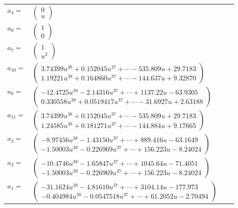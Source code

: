 \documentclass[1p]{elsarticle_modified}
\theoremstyle{definition}
\begin{document}
\begin{tabular}{m{7pt} m{180pt} m{7pt} m{180pt} }
\flushright $a_{4}=$&$\begin{pmatrix}0\\u\end{pmatrix}$ \\
\flushright $a_{6}=$&$\begin{pmatrix}1\\0\end{pmatrix}$ \\
\flushright $a_{7}=$&$\begin{pmatrix}1\\u^2\end{pmatrix}$ \\
\flushright $a_{10}=$&$\begin{pmatrix}3.74399 u^{38}+0.152045 u^{37}+\cdots-535.809 u+29.7183\\1.19221 u^{38}+0.164860 u^{37}+\cdots-144.637 u+9.32870\end{pmatrix}$ \\
\flushright $a_{8}=$&$\begin{pmatrix}-12.4725 u^{38}-2.14316 u^{37}+\cdots+1137.22 u-63.9305\\0.330558 u^{38}+0.0519417 u^{37}+\cdots-31.6927 u+2.63188\end{pmatrix}$ \\
\flushright $a_{11}=$&$\begin{pmatrix}3.74399 u^{38}+0.152045 u^{37}+\cdots-535.809 u+29.7183\\1.24585 u^{38}+0.181271 u^{37}+\cdots-144.884 u+9.17665\end{pmatrix}$ \\
\flushright $a_{3}=$&$\begin{pmatrix}-8.97456 u^{38}-1.43150 u^{37}+\cdots+889.416 u-63.1649\\-1.50003 u^{38}-0.226969 u^{37}+\cdots+156.223 u-8.24024\end{pmatrix}$ \\
\flushright $a_{2}=$&$\begin{pmatrix}-10.4746 u^{38}-1.65847 u^{37}+\cdots+1045.64 u-71.4051\\-1.50003 u^{38}-0.226969 u^{37}+\cdots+156.223 u-8.24024\end{pmatrix}$ \\
\flushright $a_{1}=$&$\begin{pmatrix}-31.1624 u^{38}-4.81610 u^{37}+\cdots+3104.14 u-177.973\\-0.404984 u^{38}-0.0547518 u^{37}+\cdots+61.2052 u-2.70494\end{pmatrix}$ \\

\end{tabular}
\end{document}

